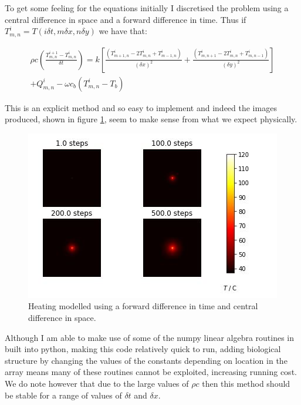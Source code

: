 \documentclass[11pt]{article} %
\begin{document}
To get some feeling for the equations initially I discretised the problem using a central difference in space and a forward difference in time. Thus if $T^i_{m,n}= T(i\delta t, m\delta x, n\delta y)$ we have that:

\begin{eqnarray}
\rho c \left( \frac{T^{i+1}_{m,n}-T^i_{m,n}}{\delta t}\right)= k\left[  \frac{(T^i_{m+1,n}-2T^i_{m,n}+T^i_{m-1,n})}{(\delta x)^2}+\frac{(T^i_{m,n+1}-2T^i_{m,n}+T^i_{m,n-1})}{(\delta y)^2}\right] \\ +Q^i_{m,n}-\omega c_b(T^i_{m,n}-T_b) \nonumber \label{euler method}
\end{eqnarray}

This is an explicit method and so easy to implement and indeed the images produced, shown in figure \ref{fig:forwardcentraldifference}, seem to make sense from what we expect physically. 

\begin{figure}
	\centering
	\includegraphics[width=0.9\linewidth]{Report_images/forward_central_difference}
	\caption{Heating modelled using a forward difference in time and central difference in space.}
	\label{fig:forwardcentraldifference}
\end{figure}

Although I am able to make use of some of the numpy linear algebra routines in built into python, making this code relatively quick to run, adding biological structure by changing the values of the constants depending on location in the array means many of these routines cannot be exploited, increasing running cost. We do note however that due to the large values of $\rho c$ then this method should be stable for a range of values of $\delta t$ and $\delta x$.
\end{document}
